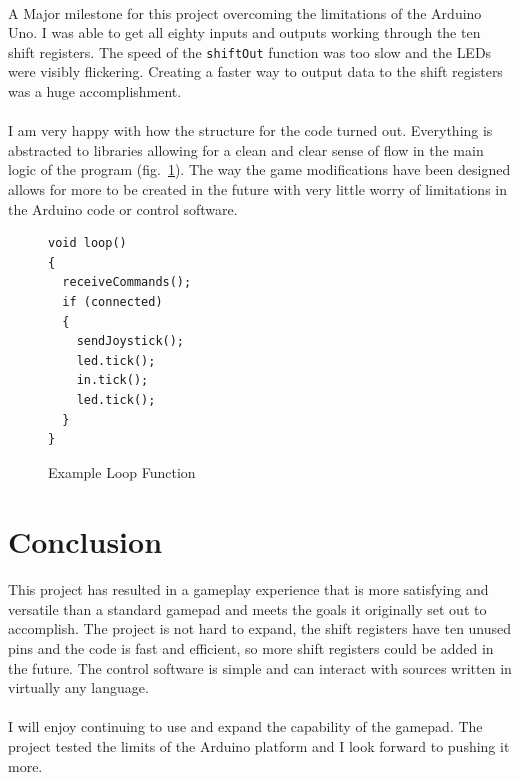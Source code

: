 \documentclass[12pt,a4paper]{article}
\begin{document}
\paragraph{}
A Major milestone for this project overcoming the limitations of the Arduino Uno. I was able to get all eighty inputs and outputs working through the ten shift registers. The speed of the \texttt{shiftOut} function was too slow and the \glspl{LED} were visibly flickering. Creating a faster way to output data to the shift registers was a huge accomplishment.
\paragraph{}
I am very happy with how the structure for the code turned out. Everything is abstracted to libraries allowing for a clean and clear sense of flow in the main logic of the program (fig.~\ref{fig:fnc_loop}). The way the game modifications have been designed allows for more to be created in the future with very little worry of limitations in the Arduino code or control software.
\begin{figure}[!h]
	\caption{Example Loop Function}
	\lstset{escapechar=@,style=customc}
	\begin{lstlisting}
void loop()
{
  receiveCommands();
  if (connected)
  {
    sendJoystick();
    led.tick();
    in.tick();
    led.tick();
  }
}
	\end{lstlisting}
	\label{fig:fnc_loop}
\end{figure}
\section{Conclusion}
\paragraph{}
This project has resulted in a gameplay experience that is more satisfying and versatile than a standard gamepad and meets the goals it originally set out to accomplish. The project is not hard to expand, the shift registers have ten unused pins and the code is fast and efficient, so more shift registers could be added in the future. The control software is simple and can interact with sources written in virtually any language.
\paragraph{}
I will enjoy continuing to use and expand the capability of the gamepad. The project tested the limits of the Arduino platform and I look forward to pushing it more.
\end{document}

